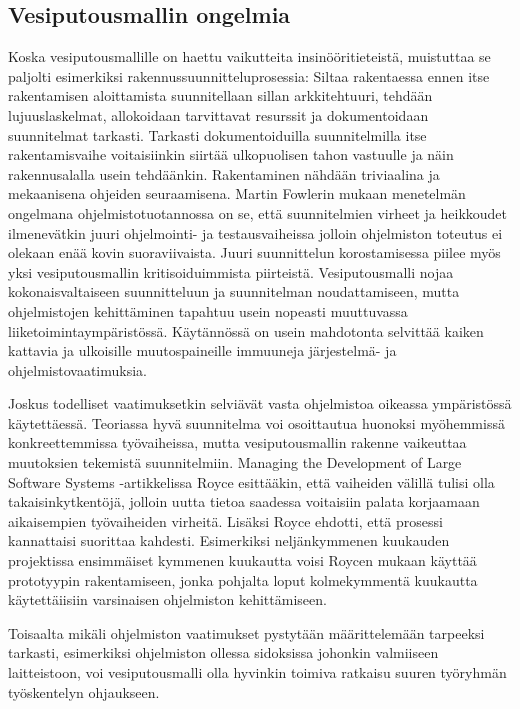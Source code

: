 \documentclass[finnish,12pt]{tktltiki2}
\theoremstyle{definition}
\theoremstyle{remark}
\begin{document}
\subsection{Vesiputousmallin ongelmia}

Koska vesiputousmallille on haettu vaikutteita insinööritieteistä, muistuttaa se paljolti esimerkiksi rakennussuunnitteluprosessia: Siltaa rakentaessa ennen itse rakentamisen aloittamista suunnitellaan sillan arkkitehtuuri, tehdään lujuuslaskelmat, allokoidaan tarvittavat resurssit ja dokumentoidaan suunnitelmat tarkasti. Tarkasti dokumentoiduilla suunnitelmilla itse rakentamisvaihe voitaisiinkin siirtää ulkopuolisen tahon vastuulle ja näin rakennusalalla usein tehdäänkin. \cite{Fowler05} Rakentaminen nähdään triviaalina ja mekaanisena ohjeiden seuraamisena. Martin Fowlerin mukaan menetelmän ongelmana ohjelmistotuotannossa on se, että suunnitelmien virheet ja heikkoudet ilmenevätkin juuri ohjelmointi- ja testausvaiheissa jolloin ohjelmiston toteutus ei olekaan enää kovin suoraviivaista. Juuri suunnittelun korostamisessa piilee myös yksi vesiputousmallin kritisoiduimmista piirteistä. Vesiputousmalli nojaa kokonaisvaltaiseen suunnitteluun ja suunnitelman noudattamiseen, mutta ohjelmistojen kehittäminen tapahtuu usein nopeasti muuttuvassa liiketoimintaympäristössä. Käytännössä on usein mahdotonta selvittää kaiken kattavia ja ulkoisille muutospaineille immuuneja järjestelmä- ja ohjelmistovaatimuksia. \cite{Sommerville10} 

Joskus todelliset vaatimuksetkin selviävät vasta ohjelmistoa oikeassa ympäristössä käytettäessä. Teoriassa hyvä suunnitelma voi osoittautua huonoksi myöhemmissä konkreettemmissa työvaiheissa, mutta vesiputousmallin rakenne vaikeuttaa muutoksien tekemistä suunnitelmiin. Managing the Development of Large Software Systems -artikkelissa Royce esittääkin, että vaiheiden välillä tulisi olla takaisinkytkentöjä, jolloin uutta tietoa saadessa voitaisiin palata korjaamaan aikaisempien työvaiheiden virheitä. \cite{Royce1970} Lisäksi Royce ehdotti, että prosessi kannattaisi suorittaa kahdesti. Esimerkiksi neljänkymmenen kuukauden projektissa ensimmäiset kymmenen kuukautta voisi Roycen mukaan käyttää prototyypin rakentamiseen, jonka pohjalta loput kolmekymmentä kuukautta käytettäiisiin varsinaisen ohjelmiston kehittämiseen.

Toisaalta mikäli ohjelmiston vaatimukset pystytään määrittelemään tarpeeksi tarkasti, esimerkiksi ohjelmiston ollessa sidoksissa johonkin valmiiseen laitteistoon, voi vesiputousmalli olla hyvinkin toimiva ratkaisu suuren työryhmän työskentelyn ohjaukseen.
\end{document}

